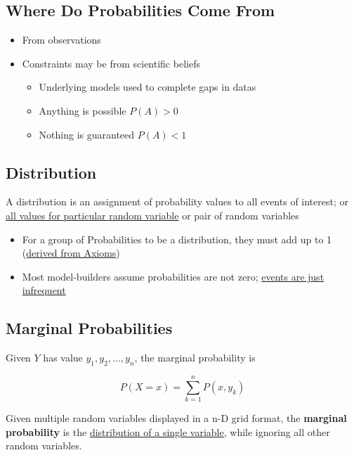   \subsection{Where Do Probabilities Come From}

    \begin{itemize}
      \item From observations
      \item Constraints may be from scientific beliefs
      \begin{itemize}
        \item Underlying models used to complete gaps in datas
        \item Anything is possible $ P\left( A \right) > 0 $
        \item Nothing is guaranteed $ P\left( A \right) < 1 $
      \end{itemize}
    \end{itemize}

  \subsection{Distribution}

    A distribution is an assignment of probability values to
    all events of interest; or \ul{all values for particular random variable} or
    pair of random variables

    \begin{itemize}
      \item For a group of Probabilities to be a distribution, they must add
      up to 1 (\ul{derived from Axioms})
      \item Most model-builders assume probabilities are not zero; \ul{
      events are just infrequent}
    \end{itemize}

  \subsection{Marginal Probabilities}

    Given $ Y $ has value $ y_{1}, y_{2}, ..., y_{n} $, the marginal
    probability is

    \begin{equation}
      P\left( X = x \right) = \sum_{k = 1}^{n} P\left( x, y_{k} \right)
    \end{equation}

    Given multiple random variables displayed in a n-D grid format,
    the \textbf{marginal probability} is the \ul{distribution of a single variable},
    while ignoring all other random variables.

